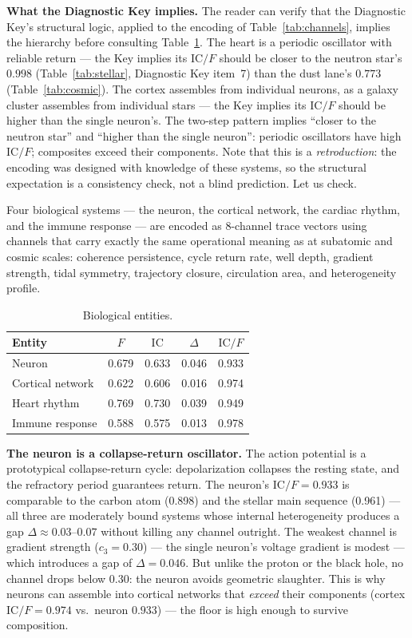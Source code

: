 \documentclass[
  aps,
  prd,
  twocolumn,
  superscriptaddress,
  nofootinbib,
  floatfix
]{revtex4-2}
\newcommand{\IC}{\mathrm{IC}}
\begin{document}
\textbf{What the Diagnostic Key implies.}
The reader can verify that the Diagnostic Key's structural
logic, applied to the encoding of Table~\ref{tab:channels},
implies the hierarchy before consulting
Table~\ref{tab:biological}.
The heart is a periodic oscillator with
reliable return --- the Key implies its $\IC/F$ should be
closer to the neutron star's $0.998$ (Table~\ref{tab:stellar},
Diagnostic Key item~7) than the dust lane's $0.773$
(Table~\ref{tab:cosmic}).  The cortex assembles from
individual neurons, as a galaxy cluster assembles from
individual stars --- the Key implies its $\IC/F$ should be
higher than the single neuron's.  The two-step pattern
implies ``closer to the neutron star'' and ``higher
than the single neuron'': periodic oscillators have high
$\IC/F$; composites exceed their components.
Note that this is a \emph{retroduction}: the encoding was
designed with knowledge of these systems, so the structural
expectation is a consistency check, not a blind prediction.
Let us check.

Four biological systems --- the neuron, the
cortical network, the cardiac rhythm, and the immune response
--- are encoded as 8-channel trace vectors using channels
that carry exactly the same operational meaning as at
subatomic and cosmic scales: coherence persistence, cycle
return rate, well depth, gradient strength, tidal symmetry,
trajectory closure, circulation area, and heterogeneity
profile.

\begin{table}[t]
\caption{\label{tab:biological}Biological entities.}
\begin{ruledtabular}
\begin{tabular}{lcccc}
Entity & $F$ & $\IC$ & $\Delta$ & $\IC/F$ \\
\hline
Neuron            & 0.679 & 0.633 & 0.046 & 0.933 \\
Cortical network  & 0.622 & 0.606 & 0.016 & 0.974 \\
Heart rhythm      & 0.769 & 0.730 & 0.039 & 0.949 \\
Immune response   & 0.588 & 0.575 & 0.013 & 0.978 \\
\end{tabular}
\end{ruledtabular}
\end{table}

\textbf{The neuron is a collapse-return oscillator.}
The action potential is a prototypical collapse-return cycle:
depolarization collapses the resting state, and the refractory
period guarantees return.  The neuron's $\IC/F = 0.933$ is
comparable to the carbon atom (0.898) and the stellar main
sequence (0.961) --- all three are moderately bound systems
whose internal heterogeneity produces a gap
$\Delta \approx 0.03$--$0.07$ without killing any channel
outright.
The weakest channel is gradient strength ($c_3 = 0.30$)
--- the single neuron's voltage gradient is modest ---
which introduces a gap of $\Delta = 0.046$.  But unlike
the proton or the black hole, no channel drops below $0.30$:
the neuron avoids geometric slaughter.  This is why neurons
can assemble into cortical networks that \emph{exceed} their
components (cortex $\IC/F = 0.974$ vs.\ neuron $0.933$) ---
the floor is high enough to survive composition.
\end{document}
